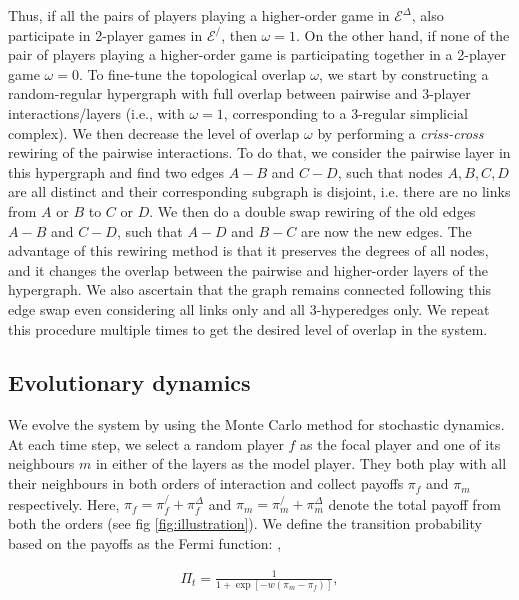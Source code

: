 \documentclass[a4paper,pre,reqno,superscriptaddress,twocolumn, floatfix]{revtex4}
\begin{document}
Thus, if all the pairs of players playing a higher-order game in $\mathcal{E}^{\Delta}$, also participate in 2-player games in $\mathcal{E}^/$, then $\omega=1$. On the other hand, if none of the pair of players playing a higher-order game is participating together in a 2-player game $\omega = 0$. To fine-tune the topological overlap $\omega$, we start by constructing a random-regular hypergraph with full overlap between pairwise and 3-player interactions/layers (i.e., with $\omega =1$, corresponding to a 3-regular simplicial complex). We then decrease the level of overlap $\omega$ by performing a \emph{criss-cross} rewiring of the pairwise interactions. To do that, we consider the pairwise layer in this hypergraph and find two edges $A-B$ and $C-D$, such that nodes $A, B, C, D$ are all distinct and their corresponding subgraph is disjoint, i.e. there are no links from $A$ or $B$ to $C$ or $D$. We then do a double swap rewiring of the old edges $A-B$ and $C-D$, such that $A-D$ and $B-C$ are now the new edges. The advantage of this rewiring method is that it preserves the degrees of all nodes, and it changes the overlap between the pairwise and higher-order layers of the hypergraph. We also ascertain that the graph remains connected following this edge swap even considering all links only and all 3-hyperedges only. We repeat this procedure multiple times to get the desired level of overlap in the system.


\subsection{Evolutionary dynamics}

We evolve the system by using the Monte Carlo method for stochastic dynamics. At each time step, we select a random player $f$ as the focal player and one of its neighbours $m$ in either of the layers as the model player. They both play with all their neighbours in both orders of interaction and collect payoffs $\pi_f$ and $\pi_m$ respectively. Here, $\pi_f = \pi_f^/ + \pi_f^{\Delta}$ and $\pi_m = \pi_m^/ + \pi_m^{\Delta}$ denote the total payoff from both the orders \cite{battiston_determinants_2017} (see fig \eqref{fig:illustration}). We define the transition probability based on the payoffs as the Fermi function: \cite{szabo_evolutionary_1998, traulsen_stochastic_2006, perc_evolutionary_2013},

\begin{align}
    \Pi_t = \frac{1}{1 + \exp[-w(\pi_m-\pi_f)]},
\end{align}
\end{document}
